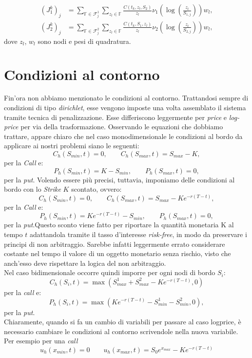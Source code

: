 \documentclass[a4paper,10pt]{report}
\theoremstyle{plain}
\theoremstyle{definition}
\theoremstyle{remark}
\begin{document}
\begin{align*}
 (J_1^{k})_j&=\sum\limits_{\mathbb{F}\in \mathcal{F}^1_j} \sum\limits_{z_l \in \mathbb{F}}\frac{C(t_k,z_l,S_2)}{z_l}\nu_1\left(\log\left(\frac{z_l}{S_{1,j}}\right)\right)w_l,\\
 (J_2^{k})_j&=\sum\limits_{\mathbb{F}\in \mathcal{F}^2_j} \sum\limits_{z_l \in \mathbb{F}}\frac{C(t_k,S_1,z_l)}{z_l}\nu_2\left(\log\left(\frac{z_l}{S_{2,j}}\right)\right)w_l,
\end{align*}
dove $z_l$, $w_l$ sono nodi e pesi di quadratura.

\section{Condizioni al contorno}
Fin'ora non abbiamo menzionato le condizioni al contorno. Trattandosi sempre di condizioni di tipo \emph{dirichlet}, esse vengono imposte una volta assemblato il sistema tramite tecnica di penalizzazione. Esse differiscono leggermente per \emph{price} e \emph{log-price} per via della trasformazione. Osservando le equazioni che dobbiamo trattare, appare chiaro che nel caso monodimensionale le condizioni al bordo da applicare ai nostri problemi siano le seguenti: $$C_h(S_{min},t)=0, \qquad C_h(S_{max},t)=S_{max}-K,$$ per la \emph{Call} e: $$P_h(S_{min},t)=K-S_{min}, \qquad P_h(S_{max},t)=0,$$ per la \emph{put}. Volendo essere pi\`u precisi, tuttavia, imponiamo delle condizioni al bordo con lo \emph{Strike} $K$ scontato, ovvero: $$C_h(S_{min},t)=0, \qquad C_h(S_{max},t)=S_{max}-Ke^{-r(T-t)},$$ per la \emph{Call} e: $$P_h(S_{min},t)=Ke^{-r(T-t)}-S_{min}, \qquad P_h(S_{max},t)=0,$$ per la \emph{put}.Questo sconto viene fatto per riportare la quantità monetaria K al tempo $t$ adattandola tramite il tasso d'interesse \emph{risk-free}, in modo da preservare i principi di non arbitraggio. Sarebbe infatti leggermente errato considerare costante nel tempo il valore di un oggetto monetario senza rischio, visto che anch'esso deve rispettare la logica del non arbitraggio.\\Nel caso bidimensionale occorre quindi imporre per ogni nodi di bordo $S_i$: $$C_h(S_i,t)=\max\left(S^1_{max}+S^2_{max}-Ke^{-r(T-t)},0\right)$$per la \emph{call} e: $$P_h(S_i,t)=\max\left(Ke^{-r(T-t)}-S^1_{min}-S^2_{min},0\right),$$ per la \emph{put}.\\
Chiaramente, quando si fa un cambio di variabili per passare al caso logprice, è necessario cambiare le condizioni al contorno scrivendole nella nuova variabile. Per esempio per una \emph{call}
\begin{equation*}
 u_h(x_{min},t)=0 \qquad u_h(x_{max},t)=S_0 e^{x_{max}}-Ke^{-r(T-t)}
\end{equation*}
\end{document}
